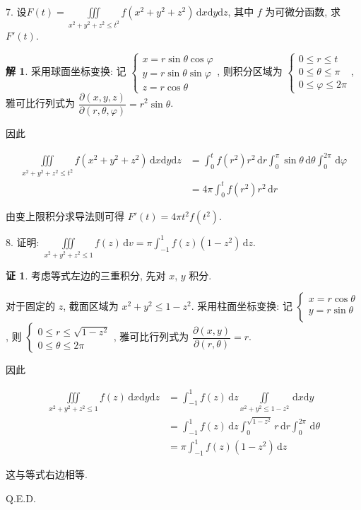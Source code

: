 \documentclass[a4paper,12pt]{article}
\theoremstyle{definition}
\newtheorem*{pf}{证}
\newtheorem*{sol}{解}
\begin{document}
7. 设$\displaystyle F(t) = \iiint\limits_{x^2+y^2+z^2 \leq t^2} f(x^2+y^2+z^2) \, \mathrm{d}x\mathrm{d}y\mathrm{d}z$, 其中 $f$ 为可微分函数, 求 $F'(t)$.
\begin{sol}
    采用球面坐标变换: 记 $\begin{cases}
            x=r\sin\theta\cos\varphi \\
            y=r\sin\theta\sin\varphi \\
            z=r\cos\theta
        \end{cases}$, 则积分区域为 $\begin{cases}
            0\leq r\leq t        \\
            0\leq \theta\leq \pi \\
            0\leq \varphi\leq 2\pi
        \end{cases}$, 雅可比行列式为 $\dfrac{\partial(x,y,z)}{\partial(r,\theta,\varphi)}=r^2\sin\theta$.

    因此

    \begin{align*}
        \iiint\limits_{x^2+y^2+z^2 \leq t^2} f(x^2+y^2+z^2) \, \mathrm{d}x\mathrm{d}y\mathrm{d}z
         & =\int_0^t f(r^2)r^2\,\mathrm{d}r\int_0^{\pi}\sin\theta\,\mathrm{d}\theta\int_0^{2\pi}\,\mathrm{d}\varphi \\
         & =4\pi\int_0^t f(r^2)r^2\,\mathrm{d}r
    \end{align*}

    由变上限积分求导法则可得 $F'(t)=4\pi t^2 f(t^2)$.
\end{sol}


8. 证明: $\displaystyle\iiint\limits_{x^2+y^2+z^2 \leq 1} f(z) \, \mathrm{d}v = \pi \int_{-1}^{1} f(z)(1-z^2) \, \mathrm{d}z$.
\begin{pf}
    考虑等式左边的三重积分, 先对 $x$, $y$ 积分.

    对于固定的 $z$, 截面区域为 $x^2+y^2\leq 1-z^2$. 采用柱面坐标变换: 记 $\begin{cases}
            x=r\cos\theta \\
            y=r\sin\theta \\
        \end{cases}$, 则 $\begin{cases}
            0\leq r\leq\sqrt{1-z^2} \\
            0\leq\theta\leq 2\pi
        \end{cases}$, 雅可比行列式为 $\dfrac{\partial(x,y)}{\partial(r,\theta)}=r$.

    因此

    \begin{align*}
        \iiint\limits_{x^2+y^2+z^2 \leq 1} f(z) \, \mathrm{d}x\mathrm{d}y\mathrm{d}z
         & =\int_{-1}^1 f(z)\,\mathrm{d}z\iint\limits_{x^2+y^2\leq 1-z^2}\,\mathrm{d}x\mathrm{d}y           \\
         & =\int_{-1}^1 f(z)\,\mathrm{d}z\int_0^{\sqrt{1-z^2}}r\,\mathrm{d}r\int_0^{2\pi}\,\mathrm{d}\theta \\
         & =\pi\int_{-1}^1 f(z)(1-z^2)\,\mathrm{d}z
    \end{align*}

    这与等式右边相等.

    Q.E.D.
\end{pf}
\end{document}
